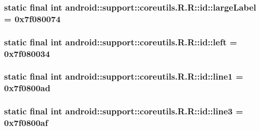 \hypertarget{classandroid_1_1support_1_1coreutils_1_1_r_1_1id_7d728a228b988788857b04bb86ec70ed}{
\subsubsection[{largeLabel}]{\setlength{\rightskip}{0pt plus 5cm}static final int android::support::coreutils.R.R::id::largeLabel = 0x7f080074}}
\label{classandroid_1_1support_1_1coreutils_1_1_r_1_1id_7d728a228b988788857b04bb86ec70ed}


\hypertarget{classandroid_1_1support_1_1coreutils_1_1_r_1_1id_f6e1aaed4f979bc982002314e83d3718}{
\subsubsection[{left}]{\setlength{\rightskip}{0pt plus 5cm}static final int android::support::coreutils.R.R::id::left = 0x7f080034}}
\label{classandroid_1_1support_1_1coreutils_1_1_r_1_1id_f6e1aaed4f979bc982002314e83d3718}


\hypertarget{classandroid_1_1support_1_1coreutils_1_1_r_1_1id_3a9880ffff36fba9e1edda36b74bab73}{
\subsubsection[{line1}]{\setlength{\rightskip}{0pt plus 5cm}static final int android::support::coreutils.R.R::id::line1 = 0x7f0800ad}}
\label{classandroid_1_1support_1_1coreutils_1_1_r_1_1id_3a9880ffff36fba9e1edda36b74bab73}


\hypertarget{classandroid_1_1support_1_1coreutils_1_1_r_1_1id_ffaaa69f8551249ba2b6dec4a5d91751}{
\subsubsection[{line3}]{\setlength{\rightskip}{0pt plus 5cm}static final int android::support::coreutils.R.R::id::line3 = 0x7f0800af}}
\label{classandroid_1_1support_1_1coreutils_1_1_r_1_1id_ffaaa69f8551249ba2b6dec4a5d91751}


